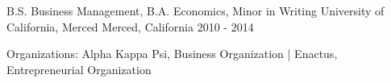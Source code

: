 


\begin{cventriesedu}


\cventry
{B.S. Business Management, B.A. Economics, Minor in Writing} %
{University of California, Merced} %
{Merced, California} %
{2010 - 2014} %
{ %
\begin{cvitems}
\item {Organizations: Alpha Kappa Psi, Business Organization | Enactus, Entrepreneurial Organization}
\end{cvitems}
}


\end{cventriesedu}